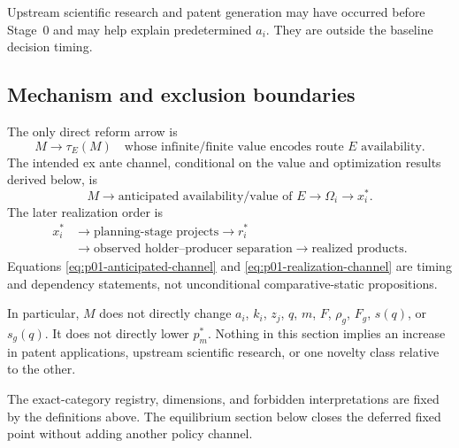 Upstream scientific research and patent generation may have occurred before
Stage~0 and may help explain predetermined \(a_i\).  They are outside the
baseline decision timing.

\subsection{Mechanism and exclusion boundaries}
\label{subsec:p01-mechanism-boundary}

The only direct reform arrow is
\begin{equation}
  M\longrightarrow \tau_E(M)
  \quad\text{whose infinite/finite value encodes route }E\text{ availability}.
  \label{eq:p01-only-direct-policy-arrow}
\end{equation}
The intended ex ante channel, conditional on the value and optimization results
derived below, is
\begin{equation}
  M
  \longrightarrow
  \text{anticipated availability/value of }E
  \longrightarrow
  \Omega_i
  \longrightarrow
  x_i^*.
  \label{eq:p01-anticipated-channel}
\end{equation}
The later realization order is
\begin{equation}
  \begin{aligned}
    x_i^*
    &\longrightarrow
    \text{planning-stage projects}
    \longrightarrow r_i^* \\
    &\longrightarrow
    \text{observed holder--producer separation}
    \longrightarrow
    \text{realized products}.
  \end{aligned}
  \label{eq:p01-realization-channel}
\end{equation}
Equations \eqref{eq:p01-anticipated-channel} and
\eqref{eq:p01-realization-channel} are timing and dependency statements, not
unconditional comparative-static propositions.

In particular, \(M\) does not directly change \(a_i\), \(k_i\), \(z_j\),
\(q\), \(m\), \(F\), \(\rho_g\), \(F_g\), \(s(q)\), or \(s_g(q)\).  It does
not directly lower \(p_m^*\).  Nothing in this section implies an increase in
patent applications, upstream scientific research, or one novelty class
relative to the other.

The exact-category registry, dimensions, and forbidden interpretations are
fixed by the definitions above.  The equilibrium section below closes the
deferred fixed point without adding another policy channel.
